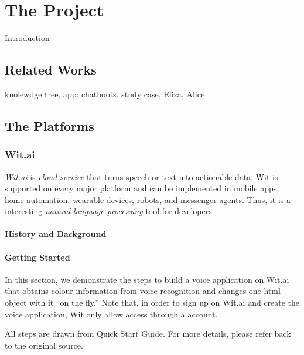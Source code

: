 \chapter{The Project}
\label{sec:project}


Introduction


\section{Related Works}

knolewdge tree, app: chatboots, study case, Eliza, Alice

\section{The Platforms}


\subsection{Wit.ai}

\emph{Wit.ai} is \emph{cloud service} that turns speech or text into actionable data.
Wit is supported on every major platform and can be implemented in mobile apps, home automation, wearable devices, robots, and messenger agents.
Thus, it is a interesting \emph{natural language processing} tool for developers.

\subsubsection{History and Background}

\subsubsection{Getting Started}


In this section, we demonstrate the steps to build a voice application on Wit.ai that obtains colour information from voice recognition and changes one html object with it ``on the fly.''
Note that, in order to sign up on Wit.ai and create the voice application, Wit only allow access through a \cite{github_2016} account.

All steps are drawn from \cite{1_wit.ai_2016} Quick Start Guide.
For more details, please refer back to the original source.

